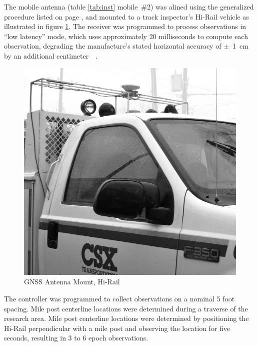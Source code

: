 
The mobile antenna (table \ref{tab:inst} mobile~\#2) was alined using the generalized procedure listed on page \pageref{Antenna Alignment}, and mounted to a track inspector's Hi-Rail vehicle as illustrated in figure \ref{fig:antHi-Rail}. The receiver was programmed to process observations in ``low latency'' mode, which uses approximately 20 milliseconds to compute each observation, degrading the manufacture's stated horizontal accuracy of $\pm$~1~cm by an additional centimeter~\cite[pp.8]{Trimble5700}~\cite[pp.9]{TrimbleR7gnss}.

\begin{figure}[h!]
  \begin{center}
    \includegraphics[scale=0.50]{graphics/HiRailAnt_modBW.png}
  \end{center}
  \caption{GNSS Antenna Mount, Hi-Rail}
  \label{fig:antHi-Rail}
\vspace{-20pt}
\end{figure}

The controller was programmed to collect observations on a nominal 5 foot spacing. Mile post centerline locations were determined during a traverse of the research area. Mile post centerline locations were determined by positioning the Hi-Rail perpendicular with a mile post and observing the location for five seconds, resulting in 3 to 6 epoch observations.

